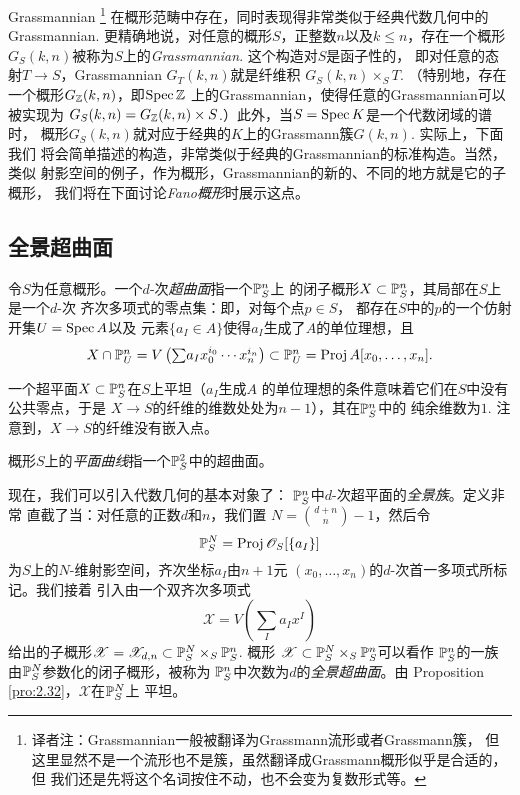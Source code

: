 Grassmannian%
\footnote{译者注：Grassmannian一般被翻译为Grassmann流形或者Grassmann簇，
但这里显然不是一个流形也不是簇，虽然翻译成Grassmann概形似乎是合适的，但
我们还是先将这个名词按住不动，也不会变为复数形式等。}%
在概形范畴中存在，同时表现得非常类似于经典代数几何中的Grassmannian.
更精确地说，对任意的概形$S$，正整数$n$以及$k\leq n$，存在一个概形
$G_S(k,n)$被称为$S$上的\textit{Grassmannian}. 这个构造对$S$是函子性的，
即对任意的态射$T\to S$，Grassmannian $G_T(k,n)$就是纤维积
$G_S(k,n)\times_S T$. （特别地，存在一个概形$G_\zz(k,n)$，即$\spec \zz$
上的Grassmannian，使得任意的Grassmannian可以被实现为
$G_S(k,n)=G_\zz(k,n)\times S$.）此外，当$S=\spec K$是一个代数闭域的谱时，
概形$G_S(k,n)$就对应于经典的$K$上的Grassmann簇$G(k,n)$. 实际上，下面我们
将会简单描述的构造，非常类似于经典的Grassmannian的标准构造。当然，类似
射影空间的例子，作为概形，Grassmannian的新的、不同的地方就是它的子概形，
我们将在下面讨论\textit{Fano概形}时展示这点。

\subsection{全景超曲面} \label{s:3.2.8}

\begin{defi}\label{defi:3.50}
令$S$为任意概形。一个$d$-次\textit{超曲面}指一个$\P_S^n$上
的闭子概形$X\subset \P_S^n$，其局部在$S$上是一个$d$-次
齐次多项式的零点集：即，对每个点$p\in S$，
都存在$S$中的$p$的一个仿射开集$U=\spec A$以及
元素$\{a_I\in A\}$使得$a_I$生成了$A$的单位理想，且
\[
	\textstyle{X\cap \P_U^n=V\left(
		{\sum}a_I x_0^{i_0}\cdots x_n^{i_n}
	\right)\subset \P_U^n=\proj A[x_0,\dots,x_n].}
\]
\end{defi}


一个超平面$X\subset \P_S^n$在$S$上平坦（$a_I$生成$A$
的单位理想的条件意味着它们在$S$中没有公共零点，于是
$X\to S$的纤维的维数处处为$n-1$），其在$\P_S^n$中的
纯余维数为$1$. 注意到，$X\to S$的纤维没有嵌入点。

概形$S$上的\textit{平面曲线}指一个$\P_S^2$中的超曲面。

现在，我们可以引入代数几何的基本对象了：
$\P^n_S$中$d$-次超平面的\textit{全景族}。定义非常
直截了当：对任意的正数$d$和$n$，我们置
$N=\binom{d+n}{n}-1$，然后令
\[
	\P^N_S=\proj \oo_S[\{a_I\}]
\]
为$S$上的$N$-维射影空间，齐次坐标$a_I$由$n+1$元
$(x_0,\dots,x_n)$的$d$-次首一多项式所标记。我们接着
引入由一个双齐次多项式
\[
	\mathscr X=V\left(\sum_I a_I x^I\right)
\]
给出的子概形$\mathscr X=\mathscr X_{d,n}
\subset \P_S^N\times_S \P_S^n$. 概形
$\mathscr X\subset \P_S^N\times_S \P_S^n$可以看作
$\P_S^n$的一族由$\P_S^N$参数化的闭子概形，被称为
$\P_S^n$中次数为$d$的\textit{全景超曲面}。由
Proposition \ref{pro:2.32}，$\mathscr X$在$\P_S^N$上
平坦。

